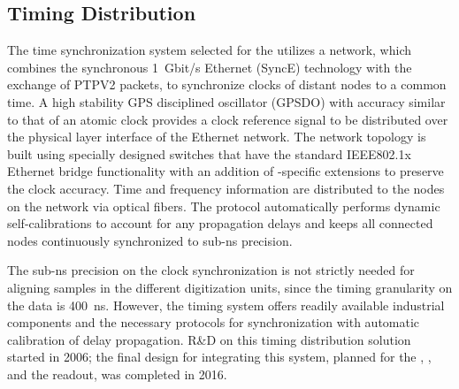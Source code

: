 \subsection{Timing Distribution}
\label{sec:fddp-tpc-elec-wr}
The time synchronization system selected for the  utilizes a  network, which combines the synchronous \SI{1}{Gbit/s} Ethernet (SyncE) technology with the exchange of PTPV2 packets, to synchronize clocks of distant nodes to a common time. A high stability GPS disciplined oscillator (GPSDO) with  accuracy similar to that of an atomic clock provides a clock reference signal to be distributed over the physical layer interface of the  Ethernet network. The network topology is built using specially designed switches that have the standard IEEE802.1x Ethernet bridge functionality with an addition of -specific extensions to preserve the clock accuracy. Time and frequency information are distributed to the nodes on the  network via optical fibers. The  protocol automatically performs dynamic self-calibrations to account for any propagation delays and keeps all connected nodes continuously synchronized to sub-ns precision. 

The sub-ns %
precision on the clock synchronization is not strictly needed for aligning samples in the different  digitization units, since the %
timing granularity on the data is \SI{400}{ns}. However, the  timing system offers readily available industrial components and the necessary protocols %
for synchronization with automatic calibration of delay propagation. %
R\&D on this timing distribution solution started in 2006; the final design for integrating this system, %
planned for the , , and the  readout, was completed in 2016. 

